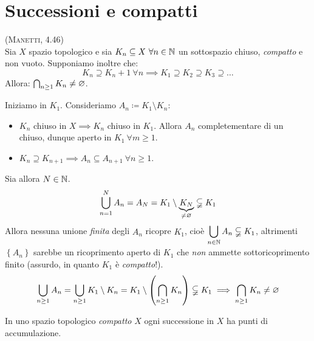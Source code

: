 \section{Successioni e compatti}
\begin{proposition}\label{compattocontenuto}\textsc{(Manetti, 4.46)}\\
Sia $X$ spazio topologico e sia $K_n\subseteq X\ \forall n\in\naturalset$ un sottospazio chiuso, \textit{compatto} e non vuoto. Supponiamo inoltre che:
\begin{equation*}
K_n\supseteq K_n+1\ \forall n\implies K_1\supseteq K_2\supseteq K_3\supseteq \ldots
\end{equation*}
Allora: $\mathop{{\bigcap}}\displaylimits_{n\geq 1}K_n\neq\varnothing$.
\end{proposition}
\begin{demonstration}
Iniziamo in $K_1$. Consideriamo $A_n\coloneqq K_1\setminus K_n$:
\begin{itemize}
	\item $K_n$ chiuso in $X\implies K_n$ chiuso in $K_1$. Allora $A_n$ completementare di un chiuso, dunque aperto in $K_1\ \forall m\geq 1$.
	\item $K_n\supseteq K_{n+1}\implies A_n\subseteq A_{n+1}\ \forall n\geq 1$.
\end{itemize}
Sia allora $N\in\mathbb{N}$.
\begin{equation*}
	\mathop{{\bigcup}}\displaylimits_{n=1}^{N}A_n=A_N=K_1\setminus \underbrace{K_N}_{\neq\varnothing}\subsetneqq K_1
\end{equation*}
Allora nessuna unione \textit{finita} degli $A_n$ ricopre $K_1$, cioè $\displaystyle \mathop{{\bigcup}}\displaylimits_{n\in\mathbb{N}}A_n\subsetneqq K_1$, altrimenti $\left\{A_n\right\}$ sarebbe un ricoprimento aperto di $K_1$ che \textit{non} ammette sottoricoprimento finito (assurdo, in quanto $K_1$ è \textit{compatto}!).
\begin{equation*}
\mathop{{\bigcup}}\displaylimits_{n\geq 1}A_n=\mathop{{\bigcup}}\displaylimits_{n\geq 1}K_1\setminus K_n=K_1\setminus \left(\mathop{{\bigcap}}\displaylimits_{n\geq 1}K_n\right)\subsetneqq K_1\implies \mathop{{\bigcap}}\displaylimits_{n\geq 1}K_n\neq\varnothing
\end{equation*}
\end{demonstration}
\begin{lemming}
In uno spazio topologico \textit{compatto} $X$ ogni successione in $X$ ha punti di accumulazione.
\end{lemming}
